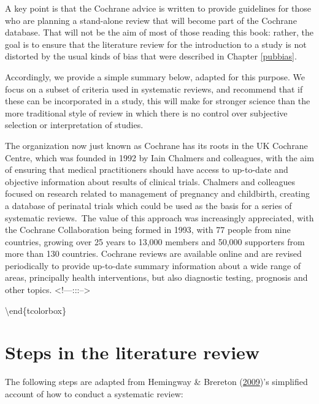 \documentclass{krantz}
\begin{document}
A key point is that the Cochrane advice is written to provide guidelines for those who are planning a stand-alone review that will become part of the Cochrane database. That will not be the aim of most of those reading this book: rather, the goal is to ensure that the literature review for the introduction to a study is not distorted by the usual kinds of bias that were described in Chapter \ref{pubbias}.

Accordingly, we provide a simple summary below, adapted for this purpose. We focus on a subset of criteria used in systematic reviews, and recommend that if these can be incorporated in a study, this will make for stronger science than the more traditional style of review in which there is no control over subjective selection or interpretation of studies.

\begin{tcolorbox}[colback=Black!5!lightgray,colframe=black!75!black,coltitle=white,title=History of Cochrane]\label{box:Cochrane}
The organization now just known as Cochrane has its roots in the UK Cochrane Centre, which was founded in 1992 by Iain Chalmers and colleagues, with the aim of ensuring that medical practitioners should have access to up-to-date and objective information about results of clinical trials. Chalmers and colleagues focused on research related to management of pregnancy and childbirth, creating a database of perinatal trials which could be used as the basis for a series of systematic reviews.\
The value of this approach was increasingly appreciated, with the Cochrane Collaboration being formed in 1993, with 77 people from nine countries, growing over 25 years to 13,000 members and 50,000 supporters from more than 130 countries. Cochrane reviews are available online and are revised periodically to provide up-to-date summary information about a wide range of areas, principally health interventions, but also diagnostic testing, prognosis and other topics.
<!---:::-->
\end{tcolorbox}

\textbackslash end\{tcolorbox\}

\hypertarget{steps-in-the-literature-review}{%
\section{Steps in the literature review}\label{steps-in-the-literature-review}}

The following steps are adapted from Hemingway \& Brereton (\protect\hyperlink{ref-hemingway2009}{2009})'s simplified account of how to conduct a systematic review:\\
\end{document}
